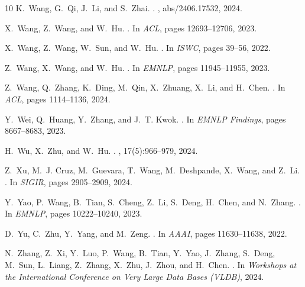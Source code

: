 \documentclass{sig-alternate-10pt}
\begin{document}
\begin{small}
\begin{thebibliography}{10}
K.~Wang, G.~Qi, J.~Li, and S.~Zhai.
.
, abs/2406.17532, 2024.

X.~Wang, Z.~Wang, and W.~Hu.
.
\newblock In {\em ACL}, pages 12693--12706, 2023.

X.~Wang, Z.~Wang, W.~Sun, and W.~Hu.
.
\newblock In {\em ISWC}, pages 39--56, 2022.

Z.~Wang, X.~Wang, and W.~Hu.
.
\newblock In {\em EMNLP}, pages 11945--11955, 2023.

Z.~Wang, Q.~Zhang, K.~Ding, M.~Qin, X.~Zhuang, X.~Li, and H.~Chen.
.
\newblock In {\em ACL}, pages 1114--1136, 2024.

Y.~Wei, Q.~Huang, Y.~Zhang, and J.~T. Kwok.
.
\newblock In {\em EMNLP Findings}, pages 8667--8683, 2023.

H.~Wu, X.~Zhu, and W.~Hu.
.
, 17(5):966–979, 2024.

Z.~Xu, M.~J. Cruz, M.~Guevara, T.~Wang, M.~Deshpande, X.~Wang, and Z.~Li.
.
\newblock In {\em SIGIR}, pages 2905--2909, 2024.

Y.~Yao, P.~Wang, B.~Tian, S.~Cheng, Z.~Li, S.~Deng, H.~Chen, and N.~Zhang.
.
\newblock In {\em EMNLP}, pages 10222--10240, 2023.

D.~Yu, C.~Zhu, Y.~Yang, and M.~Zeng.
.
\newblock In {\em AAAI}, pages 11630--11638, 2022.

N.~Zhang, Z.~Xi, Y.~Luo, P.~Wang, B.~Tian, Y.~Yao, J.~Zhang, S.~Deng, M.~Sun, L.~Liang, Z.~Zhang, X.~Zhu, J.~Zhou, and H.~Chen.
.
\newblock In {\em Workshops at the International Conference on Very Large Data Bases (VLDB)}, 2024.


\end{thebibliography}
\end{small}
\end{document}
